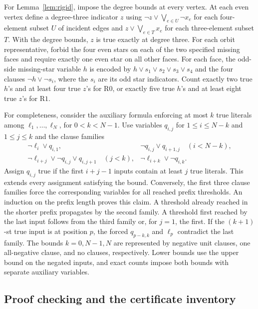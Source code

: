 \documentclass[11pt,reqno]{amsart}
\numberwithin{equation}{section}
\begin{document}
For Lemma~\ref{lem:rigid}, impose the degree bounds at every vertex.
At each even vertex define a degree-three indicator \(z\) using
\(\neg z\vee\bigvee_{e\in U}\neg x_e\) for each four-element subset
\(U\) of incident edges and \(z\vee\bigvee_{e\in T}x_e\) for each
three-element subset \(T\). With the degree bounds, \(z\) is true
exactly at degree three. For each orbit representative, forbid the
four even stars on each of the two specified missing faces and
require exactly one even star on all other faces. For each face,
the odd-side missing-star variable \(h\) is encoded by
\(h\vee s_1\vee s_2\vee s_3\vee s_4\) and the four clauses
\(\neg h\vee\neg s_i\), where the \(s_i\) are its odd star
indicators. Count exactly two true \(h\)'s and at least four
true \(z\)'s for \(\mathrm{R0}\), or exactly five true \(h\)'s
and at least eight true \(z\)'s for \(\mathrm{R1}\).

For completeness, consider the auxiliary formula enforcing at most
\(k\) true literals among \(\ell_1,\ldots,\ell_N\), for
\(0<k<N-1\). Use variables \(q_{i,j}\) for \(1\le i\le N-k\)
and \(1\le j\le k\) and the clause families
\[
  \begin{array}{ll}
  \neg\ell_i\vee q_{i,1},&
  \neg q_{i,j}\vee q_{i+1,j}\quad(i<N-k),\\[2pt]
  \neg\ell_{i+j}\vee\neg q_{i,j}\vee q_{i,j+1}\quad(j<k),&
  \neg\ell_{i+k}\vee\neg q_{i,k}.
  \end{array}
\]
Assign \(q_{i,j}\) true if the first \(i+j-1\) inputs contain
at least \(j\) true literals. This extends every assignment satisfying
the bound. Conversely, the first three clause families force the
corresponding variables for all reached prefix thresholds. An induction
on the prefix length proves this claim. A threshold already reached
in the shorter prefix propagates by the second family. A threshold
first reached by the last input follows from the third family or, for
\(j=1\), the first. If the \((k+1)\)-st true input is at position
\(p\), the forced \(q_{p-k,k}\) and \(\ell_p\) contradict the last
family. The bounds \(k=0,N-1,N\) are represented by negative unit
clauses, one all-negative clause, and no clauses, respectively.
Lower bounds use the upper bound on the negated inputs, and exact
counts impose both bounds with separate auxiliary variables.

\subsection{Proof checking and the certificate inventory}
\label{app:replay}
\end{document}
